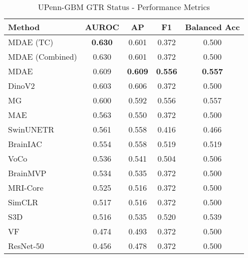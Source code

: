 \begin{table}[ht]
\centering
\caption{UPenn-GBM GTR Status - Performance Metrics}
\label{tab:upenn_gbm_gtr_status}
\begin{tabular}{lcccc}
\toprule
Method & AUROC & AP & F1 & Balanced Acc \\
\midrule
MDAE (TC) & \textbf{0.630} & 0.601 & 0.372 & 0.500 \\
MDAE (Combined) & 0.630 & 0.601 & 0.372 & 0.500 \\
MDAE & 0.609 & \textbf{0.609} & \textbf{0.556} & \textbf{0.557} \\
DinoV2 & 0.603 & 0.606 & 0.372 & 0.500 \\
MG & 0.600 & 0.592 & 0.556 & 0.557 \\
MAE & 0.563 & 0.550 & 0.372 & 0.500 \\
SwinUNETR & 0.561 & 0.558 & 0.416 & 0.466 \\
BrainIAC & 0.554 & 0.558 & 0.519 & 0.519 \\
VoCo & 0.536 & 0.541 & 0.504 & 0.506 \\
BrainMVP & 0.534 & 0.535 & 0.372 & 0.500 \\
MRI-Core & 0.525 & 0.516 & 0.372 & 0.500 \\
SimCLR & 0.517 & 0.516 & 0.372 & 0.500 \\
S3D & 0.516 & 0.535 & 0.520 & 0.539 \\
VF & 0.474 & 0.493 & 0.372 & 0.500 \\
ResNet-50 & 0.456 & 0.478 & 0.372 & 0.500 \\
\bottomrule
\end{tabular}
\end{table}
